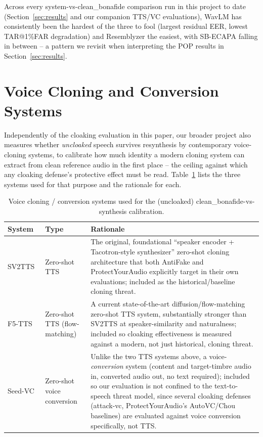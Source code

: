 \documentclass[11pt]{article}
\begin{document}
Across every system-vs-clean\_bonafide comparison run in this project
to date (Section~\ref{sec:results} and our companion TTS/VC
evaluations), WavLM has consistently been the hardest of the three to
fool (largest residual EER, lowest TAR@1\%FAR degradation) and
Resemblyzer the easiest, with SB-ECAPA falling in between -- a pattern
we revisit when interpreting the POP results in
Section~\ref{sec:results}.

\section{Voice Cloning and Conversion Systems}
\label{sec:synth}

Independently of the cloaking evaluation in this paper, our broader
project also measures whether \emph{uncloaked} speech survives
resynthesis by contemporary voice-cloning systems, to calibrate how
much identity a modern cloning system can extract from clean reference
audio in the first place -- the ceiling against which any cloaking
defense's protective effect must be read. Table~\ref{tab:synth} lists
the three systems used for that purpose and the rationale for each.

\begin{table}[H]
\centering
\caption{Voice cloning / conversion systems used for the (uncloaked) clean\_bonafide-vs-synthesis calibration.}
\label{tab:synth}
\begin{tabular}{p{2.2cm}p{1.6cm}p{8.4cm}}
\toprule
System & Type & Rationale \\
\midrule
SV2TTS~\cite{jia2018transfer}
  & Zero-shot TTS
  & The original, foundational ``speaker encoder + Tacotron-style
    synthesizer'' zero-shot cloning architecture that both AntiFake and
    ProtectYourAudio explicitly target in their own evaluations;
    included as the historical/baseline cloning threat. \\
F5-TTS~\cite{chen2024f5tts}
  & Zero-shot TTS (flow-matching)
  & A current state-of-the-art diffusion/flow-matching zero-shot TTS
    system, substantially stronger than SV2TTS at speaker-similarity
    and naturalness; included so cloaking effectiveness is measured
    against a modern, not just historical, cloning threat. \\
Seed-VC
  & Zero-shot voice conversion
  & Unlike the two TTS systems above, a voice-\emph{conversion} system
    (content and target-timbre audio in, converted audio out, no text
    required); included so our evaluation is not confined to the
    text-to-speech threat model, since several cloaking defenses
    (attack-vc, ProtectYourAudio's AutoVC/Chou baselines) are evaluated
    against voice conversion specifically, not TTS. \\
\bottomrule
\end{tabular}
\end{table}
\end{document}
